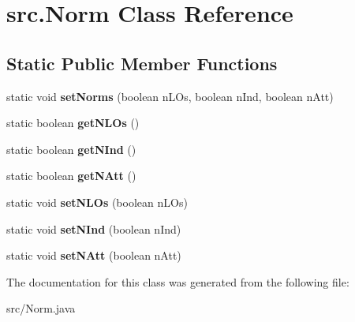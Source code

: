 \hypertarget{classsrc_1_1Norm}{}\section{src.\+Norm Class Reference}
\label{classsrc_1_1Norm}
\subsection*{Static Public Member Functions}
\begin{DoxyCompactItemize}
\item 
\mbox{\label{classsrc_1_1Norm_a75c929662a93db935c2b345ddccc9089}} 
static void {\bfseries set\+Norms} (boolean n\+L\+Os, boolean n\+Ind, boolean n\+Att)
\item 
\mbox{\label{classsrc_1_1Norm_a2e83c2e98568c8f6b7a63f881459bb2d}} 
static boolean {\bfseries get\+N\+L\+Os} ()
\item 
\mbox{\label{classsrc_1_1Norm_a73dbfff5b03ad76ba811289ec321fff0}} 
static boolean {\bfseries get\+N\+Ind} ()
\item 
\mbox{\label{classsrc_1_1Norm_a2838a0539243f3a9b40eef2cee7ebc5d}} 
static boolean {\bfseries get\+N\+Att} ()
\item 
\mbox{\label{classsrc_1_1Norm_a0f504bea0d074ccf7ee218f04c7b6d9b}} 
static void {\bfseries set\+N\+L\+Os} (boolean n\+L\+Os)
\item 
\mbox{\label{classsrc_1_1Norm_a07feefb8d8498a5e7e5264caffca6f6e}} 
static void {\bfseries set\+N\+Ind} (boolean n\+Ind)
\item 
\mbox{\label{classsrc_1_1Norm_afe39f23f6fb7588bd4305f0f10c5e837}} 
static void {\bfseries set\+N\+Att} (boolean n\+Att)
\end{DoxyCompactItemize}


The documentation for this class was generated from the following file\+:\begin{DoxyCompactItemize}
\item 
src/Norm.\+java\end{DoxyCompactItemize}
